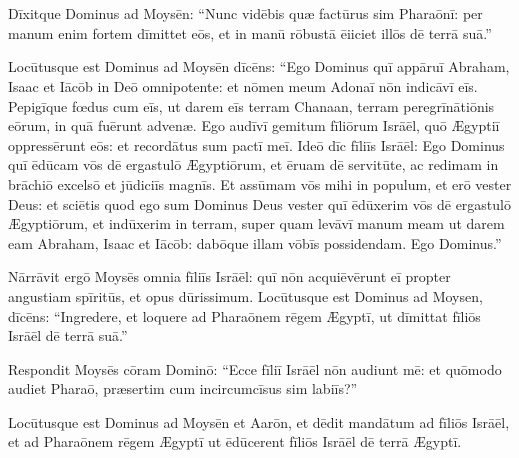 \chapter{}

Dīxitque Dominus ad Moysēn: ``Nunc vidēbis quæ factūrus
sim Pharaōnī: per manum enim fortem dīmittet
eōs, et in manū rōbustā ēiiciet illōs
dē terrā suā.''

Locūtusque est Dominus ad Moysēn dīcēns: ``Ego Dominus
quī appāruī Abraham, Isaac et Iācōb
in Deō omnipotente: et nōmen meum Adonaī
 nōn indicāvī eīs. Pepigīque fœdus cum eīs, ut
darem eīs terram Chanaan, terram peregrīnātiōnis
eōrum, in quā fuērunt advenæ. 
Ego audīvī gemitum fīliōrum Isrāēl, quō
Ægyptiī oppressērunt eōs: et recordātus
sum pactī meī. Ideō dīc fīliīs Isrāēl: Ego Dominus
quī ēdūcam vōs dē ergastulō Ægyptiōrum, et
ēruam dē servitūte, ac redimam in brāchiō
excelsō et jūdiciīs magnīs. Et assūmam vōs mihi
in populum, et erō vester Deus: et sciētis quod ego
sum Dominus Deus vester quī ēdūxerim vōs dē
ergastulō Ægyptiōrum, et indūxerim in terram, super quam
levāvī manum meam ut darem eam Abraham, Isaac
et Iācōb: dabōque illam vōbīs possidendam. 
Ego Dominus.''

Nārrāvit ergō Moysēs omnia fīliīs Isrāēl: quī nōn
acquiēvērunt eī
propter angustiam spīritūs, et opus dūrissimum. Locūtusque est
Dominus ad Moysen, dīcēns: ``Ingredere, et loquere ad Pharaōnem rēgem
Ægyptī, ut dīmittat fīliōs Isrāēl dē terrā suā.''

Respondit Moysēs cōram Dominō: ``Ecce fīliī Isrāēl nōn audiunt mē: et
quōmodo audiet
 Pharaō, præsertim cum incircumcīsus sim labiīs?'' 

Locūtusque est
Dominus ad Moysēn et Aarōn, et dēdit mandātum ad fīliōs Isrāēl, et ad
Pharaōnem rēgem Ægyptī ut ēdūcerent fīliōs Isrāēl dē terrā Ægyptī.
